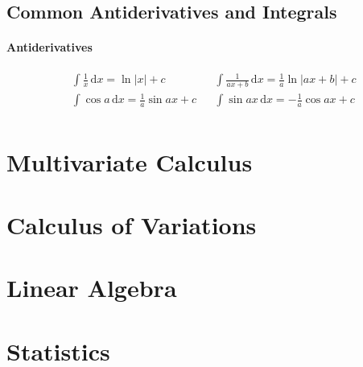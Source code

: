 \documentclass[12pt]{article}
\newcommand{\der}[1]{\, \mathrm{d}#1}
\begin{document}
\subsection{Common Antiderivatives and Integrals}
\paragraph{Antiderivatives}
\begin{align*}
&\int\frac{1}{x}\der{x} = \ln|x| + c & &\int{\frac{1}{ax + b}\der{x}} = \frac{1}{a}\ln|ax+b| + c \\
&\int \cos a \der{x}= \frac1a \sin ax + c & &\int \sin ax\der{x}= - \frac1a \cos ax + c \\
&
\end{align*}
\section{Multivariate Calculus}
\section{Calculus of Variations}
\section{Linear Algebra}
\section{Statistics}
\end{document}
